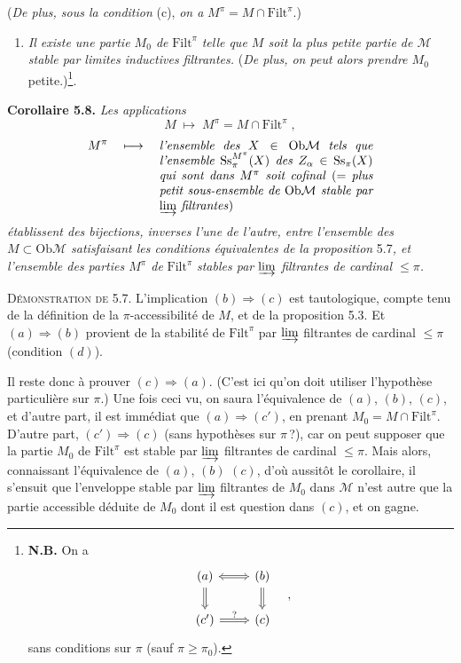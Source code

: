 \documentclass[11pt]{article}
\newcommand{\printedpage}[1]{\marginpar{\footnotesize p.~#1}}
\newcommand{\msp}[1]{\marginpar{\footnotesize [#1]}}
\newcommand{\Filt}{\mathrm{Filt}}
\newcommand{\Ob}{\mathrm{Ob}}
\newcommand{\Ss}{\mathrm{Ss}}
\newcommand{\M}{\mathcal{M}}
\begin{document}
(\textit{De plus, sous la condition} (c), \textit{on a}
\printedpage{35}
\msp{page 58}
$M^\pi = M \cap \Filt^\pi$.)
\begin{enumerate}[label={}]
\item[c$'$)] \textit{Il existe une partie $M_0$ de} $\Filt^\pi$ \textit{telle que $M$ soit la plus petite partie de $\M$ stable par limites inductives filtrantes.} (\textit{De plus, on peut alors prendre $M_0$} petite.)\footnote[22]{\textbf{N.B.} On a
\[
\begin{tikzcd}[ampersand replacement=\&]
(a) \arrow[r, Leftrightarrow] \arrow[d, Rightarrow] \& (b) \arrow[d, Rightarrow] \\
(c') \arrow[r, Rightarrow, "?"] \& (c)
\end{tikzcd}
\quad ,
\]
sans conditions sur $\pi$ (sauf $\pi \geq \pi_0$).}.
\end{enumerate}

\textbf{Corollaire 5.8.} \textit{Les applications}
\[
M \;\longmapsto\; M^\pi = M \cap \Filt^\pi \;,
\]
\[
M^\pi \quad\longmapsto\quad \parbox[t]{0.5\textwidth}{\textit{l'ensemble des $X \in \Ob\M$ tels que l'ensemble $\Ss_\pi^{M^\pi}(X)$ des $Z_\alpha \in \Ss_\pi(X)$ qui sont dans $M^\pi$ soit cofinal} (= \textit{plus petit sous-ensemble de $\Ob\M$ stable par $\varinjlim$ filtrantes})}
\]
\textit{établissent des bijections, inverses l'une de l'autre, entre l'ensemble des $M \subset \Ob\M$ satisfaisant les conditions équivalentes de la proposition} 5.7\textit{, et l'ensemble des parties $M^\pi$ de} $\Filt^\pi$ \textit{stables par $\varinjlim$ filtrantes de cardinal $\leq \pi$.}

\textsc{Démonstration de} 5.7. L'implication $(b) \Longrightarrow (c)$ est tautologique, compte tenu de la définition de la $\pi$-accessibilité de $M$, et de la proposition 5.3. Et $(a) \Longrightarrow (b)$ provient de la stabilité de $\Filt^\pi$ par $\varinjlim$ filtrantes de cardinal $\leq \pi$ (condition $(d)$).

Il reste donc à prouver $(c) \Longrightarrow (a)$. (C'est ici qu'on doit utiliser l'hypothèse particulière sur $\pi$.) Une fois ceci vu, on saura l'équivalence de $(a)$, $(b)$, $(c)$, et d'autre part, il est immédiat que $(a) \Longrightarrow (c')$, en
\msp{page 59}
prenant $M_0 = M \cap \Filt^\pi$. D'autre part, $(c') \Longrightarrow (c)$ (sans hypothèses sur $\pi\,$?), car on peut supposer que la partie $M_0$ de $\Filt^\pi$ est stable par $\varinjlim$ filtrantes de cardinal $\leq \pi$. Mais alors, connaissant l'équivalence de $(a)$, $(b)$ $(c)$, d'où aussitôt le corollaire, il s'ensuit que l'enveloppe stable par $\varinjlim$ filtrantes de $M_0$ dans $\M$ n'est autre que la partie accessible déduite de $M_0$ dont il est question dans $(c)$, et on gagne. %
\end{document}
